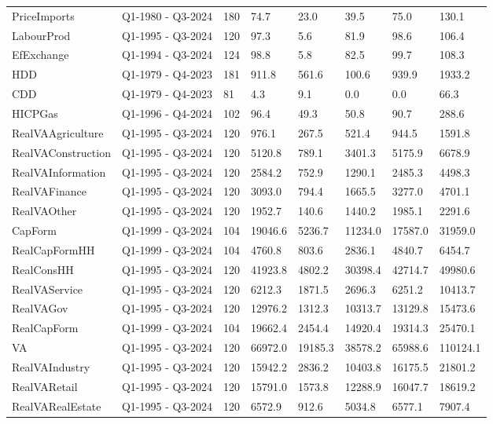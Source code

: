 \begin{longtable}[t]{llllllll}
\addlinespace
PriceImports & Q1-1980 - Q3-2024 & 180 & 74.7 & 23.0 & 39.5 & 75.0 & 130.1\\
LabourProd & Q1-1995 - Q3-2024 & 120 & 97.3 & 5.6 & 81.9 & 98.6 & 106.4\\
EfExchange & Q1-1994 - Q3-2024 & 124 & 98.8 & 5.8 & 82.5 & 99.7 & 108.3\\
HDD & Q1-1979 - Q4-2023 & 181 & 911.8 & 561.6 & 100.6 & 939.9 & 1933.2\\
CDD & Q1-1979 - Q4-2023 & 81 & 4.3 & 9.1 & 0.0 & 0.0 & 66.3\\
\addlinespace
HICPGas & Q1-1996 - Q4-2024 & 102 & 96.4 & 49.3 & 50.8 & 90.7 & 288.6\\
RealVAAgriculture & Q1-1995 - Q3-2024 & 120 & 976.1 & 267.5 & 521.4 & 944.5 & 1591.8\\
RealVAConstruction & Q1-1995 - Q3-2024 & 120 & 5120.8 & 789.1 & 3401.3 & 5175.9 & 6678.9\\
RealVAInformation & Q1-1995 - Q3-2024 & 120 & 2584.2 & 752.9 & 1290.1 & 2485.3 & 4498.3\\
RealVAFinance & Q1-1995 - Q3-2024 & 120 & 3093.0 & 794.4 & 1665.5 & 3277.0 & 4701.1\\
\addlinespace
RealVAOther & Q1-1995 - Q3-2024 & 120 & 1952.7 & 140.6 & 1440.2 & 1985.1 & 2291.6\\
CapForm & Q1-1999 - Q3-2024 & 104 & 19046.6 & 5236.7 & 11234.0 & 17587.0 & 31959.0\\
RealCapFormHH & Q1-1999 - Q3-2024 & 104 & 4760.8 & 803.6 & 2836.1 & 4840.7 & 6454.7\\
RealConsHH & Q1-1995 - Q3-2024 & 120 & 41923.8 & 4802.2 & 30398.4 & 42714.7 & 49980.6\\
RealVAService & Q1-1995 - Q3-2024 & 120 & 6212.3 & 1871.5 & 2696.3 & 6251.2 & 10413.7\\
\addlinespace
RealVAGov & Q1-1995 - Q3-2024 & 120 & 12976.2 & 1312.3 & 10313.7 & 13129.8 & 15473.6\\
RealCapForm & Q1-1999 - Q3-2024 & 104 & 19662.4 & 2454.4 & 14920.4 & 19314.3 & 25470.1\\
VA & Q1-1995 - Q3-2024 & 120 & 66972.0 & 19185.3 & 38578.2 & 65988.6 & 110124.1\\
RealVAIndustry & Q1-1995 - Q3-2024 & 120 & 15942.2 & 2836.2 & 10403.8 & 16175.5 & 21801.2\\
RealVARetail & Q1-1995 - Q3-2024 & 120 & 15791.0 & 1573.8 & 12288.9 & 16047.7 & 18619.2\\
\addlinespace
RealVARealEstate & Q1-1995 - Q3-2024 & 120 & 6572.9 & 912.6 & 5034.8 & 6577.1 & 7907.4\\

\end{longtable}
